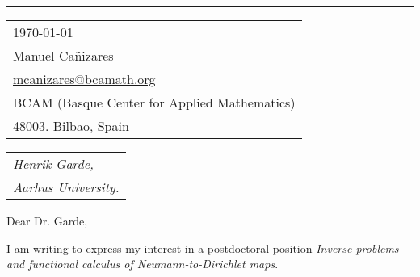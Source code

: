 \documentclass{article}
\begin{document}


\vspace{-1em} %

\rule{\linewidth}{1pt} %



\hfill
\begin{tabular}{l @{}}
\hfill \today \bigskip\\ %
\hfill Manuel Ca\~{n}izares \\
\hfill \href{mailto:mcanizares@bcamath.org}{mcanizares@bcamath.org}\\
\hfill BCAM (Basque Center for Applied Mathematics)\\
\hfill 48003. Bilbao, Spain \\ %
\end{tabular}

\bigskip %


\begin{tabular}{@{} l}\\
		\textit{Henrik Garde,}\\\textit{Aarhus University.}
\end{tabular}

\bigskip %

Dear Dr. Garde,

\bigskip %


I am writing to express my interest in a postdoctoral position \textit{Inverse problems and functional calculus of Neumann-to-Dirichlet maps}.
\end{document}
